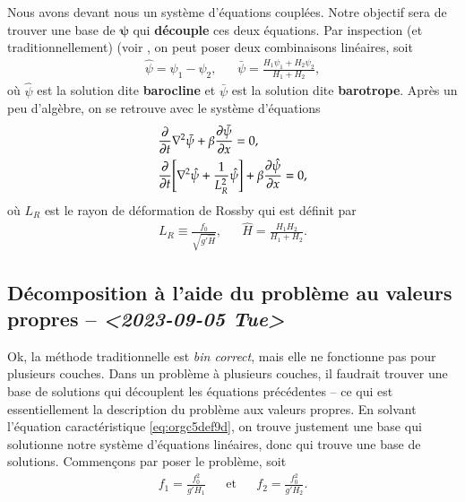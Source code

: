\documentclass[10pt]{article}
\numberwithin{equation}{section}
\begin{document}
Nous avons devant nous un système d'équations couplées.
Notre objectif sera de trouver une base de \(\boldsymbol{\psi}\) qui \textbf{découple} ces deux équations.
Par inspection (et traditionnellement) (voir \citep[p.230]{vallis_2006}, on peut poser deux combinaisons linéaires, soit
\begin{align}
   &&\hat{\psi} = \psi_1 - \psi_2 ,&& \bar{\psi} = \frac{H_1\psi_1 + H_2\psi_2}{H_1+H_2}, &&
\end{align}
où \(\hat{\psi}\) est la solution dite \textbf{barocline} et \(\bar{\psi}\) est la solution dite \textbf{barotrope}.
Après un peu d'algèbre, on se retrouve avec le système d'équations
\begin{subequations}
\begin{align}
   &\pdv{}{t} \laplacian\bar{\psi} + \beta \pdv{\bar{\psi}}{x} = 0,\\
   &\pdv{}{t} \qty[\laplacian\hat{\psi} + \frac{1}{L_R^2}\hat{\psi}] + \beta \pdv{\hat{\psi}}{x} = 0,
\end{align}
\end{subequations}
où \(L_R\) est le rayon de déformation de Rossby qui est définit par
\begin{align}
   && L_R \equiv \frac{f_0}{\sqrt{g'\hat{H}}}, && \hat{H} = \frac{H_1H_2}{H_1+H_2}.&&
\end{align}

\subsection{Décomposition à l'aide du problème au valeurs propres -- \textit{<2023-09-05 Tue>}}
\label{sec:orgfac5b21}

Ok, la méthode traditionnelle est \emph{bin correct}, mais elle ne fonctionne pas pour plusieurs couches.
Dans un problème à plusieurs couches, il faudrait trouver une base de solutions qui découplent les équations précédentes -- ce qui est essentiellement la description du problème aux valeurs propres.
En solvant l'équation caractéristique \ref{eq:orgc5def9d}, on trouve justement une base qui solutionne notre système d'équations linéaires, donc qui trouve une base de solutions.
Commençons par poser le problème, soit
\begin{align}
   && f_1 = \frac{f_0^2}{g'H_1} && \text{et} && f_2 = \frac{f_0^2}{g'H_2}. &&
\end{align}
\end{document}
